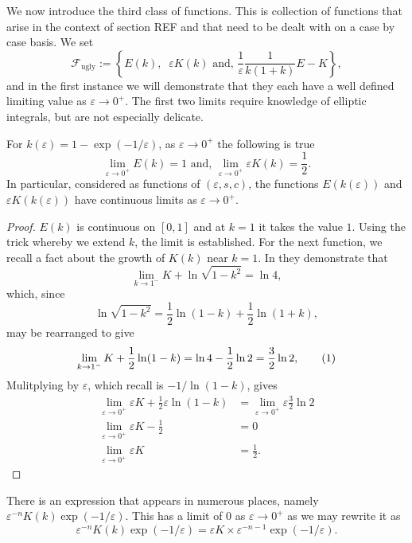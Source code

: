 We now introduce the third class of functions. This is collection of functions that arise in the context of section REF  and that need to be dealt with on a case by case basis. We set
\[
\mathcal{F}_\text{ugly} := \left\{ E(k),\;\; εK(k) \text{ and, } \frac{1}{ε}\frac{1}{k(1+k)} E - K \right\},
\]
and in the first instance we will demonstrate that they each have a well defined limiting value as $ε\to 0^+$. The first two limits require knowledge of elliptic integrals, but are not especially delicate.
\begin{lem}\label{lem:limit_ugly_1}
For $k(ε) = 1 - \exp(-1/ε)$, as $ε\to 0^+$ the following is true
\[
\lim_{ε\to 0^+} E(k) = 1 \text{ and, } \lim_{ε\to 0^+} εK(k) = \frac{1}{2}.
\]
In particular, considered as functions of $(ε,s,c)$, the functions $E(k(ε))$ and $εK(k(ε))$ have continuous limits as $ε \to 0^+$.

\begin{proof}
$E(k)$ is continuous on $[0,1]$ and at $k=1$ it takes the value $1$. Using the trick whereby we extend $k$, the limit is established. For the next function, we recall a fact about the growth of $K(k)$ near $k=1$. In \cite{Anderson} they demonstrate that
\[
\lim_{k \to 1^-} K + \ln\sqrt{1-k^2} = \ln 4,
\]
which, since
\[
\ln\sqrt{1-k^2} = \frac{1}{2}\ln(1-k) + \frac{1}{2}\ln(1+k),
\]
may be rearranged to give
\[
\lim_{k \to 1^-} K + \frac{1}{2}\ln(1-k) = \ln 4 - \frac{1}{2}\ln 2 = \frac{3}{2}\ln 2, \labelthis{eqn:order K}
\]
Mulitplying by $ε$, which recall is $-1/\ln(1-k)$, gives
\begin{align*}
\lim_{ε \to 0^+} εK + \frac{1}{2}ε\ln(1-k) &= \lim_{ε \to 0^+} ε\frac{3}{2}\ln 2 \\
\lim_{ε \to 0^+} εK - \frac{1}{2} &= 0 \\
\lim_{ε \to 0^+} εK &= \frac{1}{2}.
\end{align*}
\end{proof}
\end{lem}

There is an expression that appears in numerous places, namely $
ε^{-n}K(k)\exp(-1/ε)$. This has a limit of $0$ as $ε\to 0^+$ as we may rewrite it as
\[
ε^{-n}K(k)\exp(-1/ε) = εK \times ε^{-n-1}\exp(-1/ε).
\]

